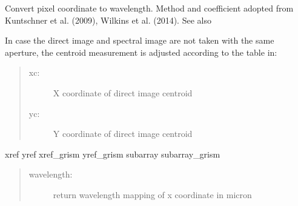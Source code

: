 \documentclass[a4paper,11pt,english]{sphinxmanual}
\begin{document}
\begin{fulllineitems}
\begin{fulllineitems}
\label{\detokenize{cascade.instruments:cascade.instruments.instruments.HSTWFC3._WFC3Dispersion}}
Convert pixel coordinate to wavelength. Method and coefficient
adopted from Kuntschner et al. (2009), Wilkins et al. (2014). See also

In case the direct image and spectral image are not taken with the
same aperture, the centroid measurement is adjusted according to the
table in: 
\begin{quote}
\begin{description}
\item[{xc:}] \leavevmode
X coordinate of direct image centroid

\item[{yc:}] \leavevmode
Y coordinate of direct image centroid

\end{description}
\end{quote}

xref
yref
xref\_grism
yref\_grism
subarray
subarray\_grism
\begin{quote}
\begin{description}
\item[{wavelength:}] \leavevmode
return wavelength mapping of x coordinate in micron

\end{description}
\end{quote}

\end{fulllineitems}


\end{fulllineitems}

\end{document}
